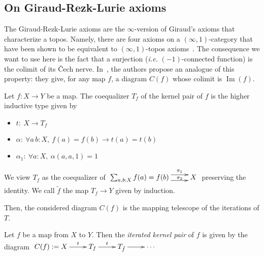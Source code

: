 \documentclass[notfinal]{jfrarticle}
\makeatletter
\def\dar[#1]#2{\ar@<-#2>[#1]\ar@<#2>[#1]} %
\DeclareMathOperator{\im}{Im}
\newcommand \colim {\mathrm{colim}}
\newcommand{\ie}{\emph{i.e.}}
\makeatother
\begin{document}

\subsection{On Giraud-Rezk-Lurie axioms}
\label{ssec:giraud-ax}


The Giraud-Rezk-Lurie axioms are the $\infty$-version of Giraud's
axioms that characterize a topos. Namely, there are four axioms on a
$(\infty,1)$-category that have been shown to be equivalent to
$(\infty,1)$-topos axioms~\cite[Chapter 6]{lurie}.
%
The consequence we want to use here is the fact that a surjection
(\ie{} $(-1)$-connected function) is the colimit of its \v{C}ech
nerve.
%
In~\cite{boulier}, the authors propose an analogue of this property:
they give, for any map $f$, a diagram $C(f)$ whose colimit is $\im(f)$.

\begin{defi}
  Let $f:X \to Y$ be a map. The coequalizer $T_f$ of the kernel pair of $f$ is the higher inductive type given
  by
  \begin{itemize}
  \item $t:~X \to T_f$
  \item $\alpha:~\forall a\,b:X,~f(a) = f(b) \to t(a) = t(b)$
  \item $\alpha_1:~\forall a:X,~\alpha(a, a, 1) = 1$
  \end{itemize}
  We view $T_f$ as the coequalizer of
  $\xymatrix{
    \sum_{a,b:X} f(a) = f(b) \dar[r]{4pt}^-{\pi_1}_-{\pi_2} & X
  }$
  preserving the identity.
  We call $\tilde f$ the map $T_f \to Y$ given by induction.
\end{defi}

Then, the considered diagram $C(f)$  is the mapping telescope of the iterations
of $T$.
\begin{defi}
  Let $f$ be a map from $X$ to $Y$. Then the {\em iterated kernel pair} of
  $f$ 
  is given by the diagram
  $\xymatrix{
    C(f) := X \ar[r]^-t & T_f \ar[r]^-t & T_{\tilde f} \ar[r] &\cdots
  }$
\end{defi}
\end{document}
